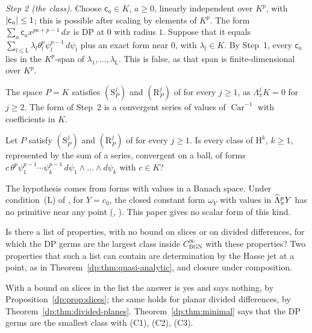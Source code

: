 \emph{Step 2 (the class).} Choose $\mathsf c_a\in K$, $a\ge0$, linearly independent over $K^p$, with $\lvert \mathsf c_a\rvert\le1$; this is possible after scaling by elements of $K^p$. The form $\sum_a\mathsf c_ax^{pa+p-1}\,dx$ is DP at $0$ with radius $1$. Suppose that it equals $\sum_{l\le\mathsf L}\lambda_l\theta_l^p\psi_l^{p-1}\,d\psi_l$ plus an exact form near $0$, with $\lambda_l\in K$. By Step~1, every $\mathsf c_a$ lies in the $K^p$-span of $\lambda_1,\dots,\lambda_{\mathsf L}$. This is false, as that span is finite-dimensional over $K^p$.

The space $P=K$ satisfies $(\mathrm S^j_P)$ and $(\mathrm R^j_P)$ of \cite[Section~3]{I} for every $j\ge1$, as $\Lambda^j_\pi K=0$ for $j\ge2$. The form of Step~2 is a convergent series of values of $\operatorname{Car}^{-1}$ with coefficients in $K$.

\begin{question}\label{dp:q:cartier}
Let $P$ satisfy $(\mathrm S^j_P)$ and $(\mathrm R^j_P)$ of \cite[Section~3]{I} for every $j\ge1$. Is every class of $\mathrm H^k$, $k\ge1$, represented by the sum of a series, convergent on a ball, of forms $c\,\theta^p\psi_1^{p-1}\cdots\psi_k^{p-1}\,d\psi_1\wedge\dots\wedge d\psi_k$ with $c\in K$?
\end{question}

The hypothesis comes from forms with values in a Banach space. Under condition~(L) of \cite[Section~7.1]{I}, for $Y=c_0$, the closed constant form $\omega_Y$ with values in $\widehat\Lambda^p_\pi Y$ has no primitive near any point (\cite[Proposition~10.9]{I}, \cite[Theorem~7.7]{I}). This paper gives no scalar form of this kind.

\begin{question}\label{dp:q:largest}
Is there a list of properties, with no bound on slices or on divided differences, for which the DP germs are the largest class inside $C^\infty_{\mathrm{BGN}}$ with these properties? Two properties that such a list can contain are determination by the Hasse jet at a point, as in Theorem~\ref{dp:thm:quasi-analytic}, and closure under composition.
\end{question}

With a bound on slices in the list the answer is yes and says nothing, by Proposition~\ref{dp:prop:slices}; the same holds for planar divided differences, by Theorem~\ref{dp:thm:divided-planes}. Theorem~\ref{dp:thm:minimal} says that the DP germs are the smallest class with (C1), (C2), (C3).
